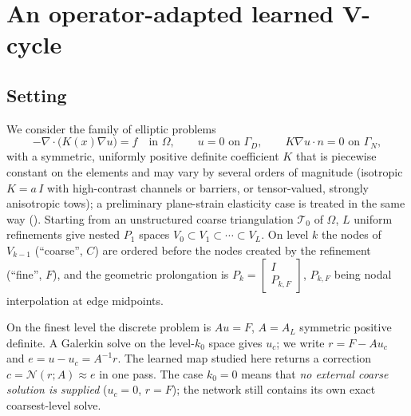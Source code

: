 \section{An operator-adapted learned V-cycle}\label{sec:method}

\subsection{Setting}\label{sec:setting}
We consider the family of elliptic problems
\begin{equation}\label{eq:pde}
  -\nabla\cdot\big(K(x)\nabla u\big) = f \quad\text{in } \Omega, \qquad u = 0 \text{ on } \Gamma_D,
  \qquad K\nabla u\cdot n = 0 \text{ on } \Gamma_N,
\end{equation}
with a symmetric, uniformly positive definite coefficient $K$ that is piecewise constant on the elements and may vary
by several orders of magnitude (isotropic $K = a\,I$ with high-contrast channels or barriers, or tensor-valued, strongly
anisotropic tows); a preliminary plane-strain elasticity case is treated in the same way (). Starting from an
unstructured coarse triangulation $\mathcal{T}_0$ of $\Omega$, $L$ uniform refinements give nested $P_1$ spaces
$V_0\subset V_1\subset\cdots\subset V_L$. On level $k$ the nodes of $V_{k-1}$ (``coarse'', $C$) are ordered before the
nodes created by the refinement (``fine'', $F$), and the geometric prolongation is
$P_k = \begin{bmatrix} I \\ P_{k,F}\end{bmatrix}$, $P_{k,F}$ being nodal interpolation at edge midpoints.

On the finest level the discrete problem is $A u = F$, $A = A_L$ symmetric positive definite. A Galerkin solve on the
level-$k_0$ space gives $u_c$; we write $r = F - A u_c$ and $e = u - u_c = A^{-1} r$. The learned map studied here
returns a correction $c = \mathcal{N}(r; A)\approx e$ in one pass. The case $k_0 = 0$ means that \emph{no external coarse
solution is supplied} ($u_c = 0$, $r = F$); the network still contains its own exact coarsest-level solve.

